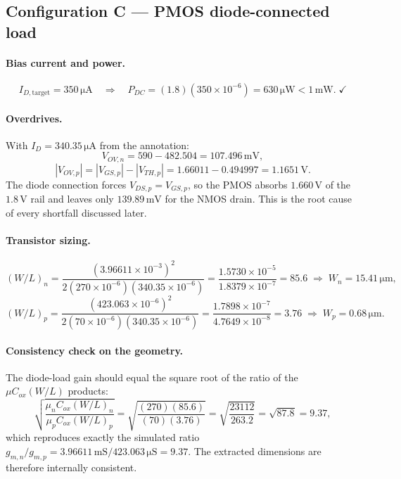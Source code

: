 \documentclass[12pt,a4paper]{article}
\newcommand{\U}[1]{\,\mathrm{#1}}
\newcommand{\WLi}[1]{\left(W/L\right)_{#1}}
\begin{document}
\subsection{Configuration C --- PMOS diode-connected load}
\paragraph{Bias current and power.}
\[
I_{D,\text{target}} = 350\U{\mu A}
\quad\Rightarrow\quad
P_{DC} = (1.8)(350\times10^{-6}) = 630\U{\mu W} < 1\U{mW}.\;\checkmark
\]

\paragraph{Overdrives.}
With $I_D = 340.35\U{\mu A}$ from the annotation:
\[
V_{OV,n} = 590 - 482.504 = 107.496\U{mV},
\]
\[
|V_{OV,p}| = |V_{GS,p}|-|V_{TH,p}| = 1.66011 - 0.494997 = 1.1651\U{V}.
\]
The diode connection forces $V_{DS,p}=V_{GS,p}$, so the PMOS absorbs
$1.660\U{V}$ of the $1.8\U{V}$ rail and leaves only $139.89\U{mV}$ for the
NMOS drain. This is the root cause of every shortfall discussed later.

\paragraph{Transistor sizing.}
\[
\WLi{n} = \frac{(3.96611\times10^{-3})^{2}}
               {2(270\times10^{-6})(340.35\times10^{-6})}
        = \frac{1.5730\times10^{-5}}{1.8379\times10^{-7}} = 85.6
\;\Rightarrow\; W_n = 15.41\U{\mu m},
\]
\[
\WLi{p} = \frac{(423.063\times10^{-6})^{2}}
               {2(70\times10^{-6})(340.35\times10^{-6})}
        = \frac{1.7898\times10^{-7}}{4.7649\times10^{-8}} = 3.76
\;\Rightarrow\; W_p = 0.68\U{\mu m}.
\]

\paragraph{Consistency check on the geometry.}
The diode-load gain should equal the square root of the ratio of the
$\mu C_{ox}(W/L)$ products:
\[
\sqrt{\frac{\mu_n C_{ox}\WLi{n}}{\mu_p C_{ox}\WLi{p}}}
= \sqrt{\frac{(270)(85.6)}{(70)(3.76)}}
= \sqrt{\frac{23112}{263.2}} = \sqrt{87.8} = 9.37,
\]
which reproduces exactly the simulated ratio
$g_{m,n}/g_{m,p} = 3.96611\U{mS}/423.063\U{\mu S} = 9.37$.
The extracted dimensions are therefore internally consistent.
\end{document}
